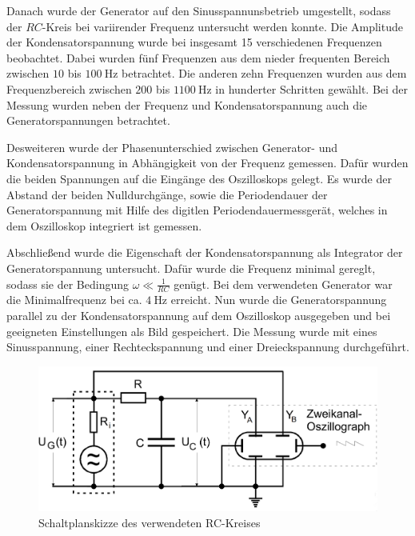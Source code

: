 Danach wurde der Generator auf den Sinusspannunsbetrieb umgestellt, sodass
der $RC$-Kreis bei variirender Frequenz untersucht werden konnte.
Die Amplitude der Kondensatorspannung wurde bei insgesamt 15 verschiedenen
Frequenzen beobachtet. Dabei wurden fünf Frequenzen aus dem nieder
frequenten Bereich zwischen $10$ bis $\SI{100}{\hertz}$ betrachtet. Die
anderen zehn Frequenzen wurden aus dem Frequenzbereich zwischen $200$ bis
$\SI{1100}{\hertz}$ in hunderter Schritten gewählt. Bei der Messung wurden
neben der Frequenz und Kondensatorspannung auch die Generatorspannungen betrachtet.

Desweiteren wurde der Phasenunterschied zwischen Generator- und Kondensatorspannung
in Abhängigkeit von der Frequenz gemessen. Dafür wurden die beiden Spannungen
auf die Eingänge des Oszilloskops gelegt. Es wurde der Abstand der beiden
Nulldurchgänge, sowie die Periodendauer der Generatorspannung mit Hilfe
des digitlen Periodendauermessgerät, welches in dem Oszilloskop integriert ist
gemessen.

Abschließend wurde die Eigenschaft der Kondensatorspannung als Integrator
der Generatorspannung untersucht. Dafür wurde die Frequenz minimal gereglt,
sodass sie der Bedingung $\omega\ll \frac{1}{RC}$ genügt. Bei dem verwendeten
Generator war die Minimalfrequenz bei ca. $\SI{4}{\hertz}$ erreicht.
Nun wurde die Generatorspannung parallel zu der Kondensatorspannung auf dem
Oszilloskop ausgegeben und bei geeigneten Einstellungen als Bild gespeichert.
Die Messung wurde mit eines Sinusspannung, einer Rechteckspannung und einer
Dreieckspannung durchgeführt.\\

\FloatBarrier
\begin{figure}
  \includegraphics[width=\textwidth]{Aufbau_V353.PNG}
  \caption{Schaltplanskizze des verwendeten RC-Kreises}
  \label{fig:Aufbau}
\end{figure}


